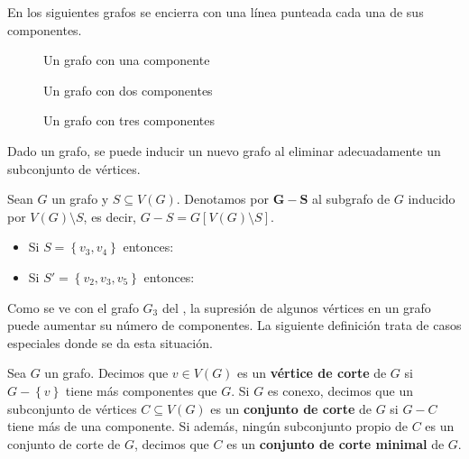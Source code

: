 \begin{Ejm}
   En los siguientes grafos se encierra con una línea punteada cada una de sus componentes.
   \begin{figure}[H]
     \centering
       \resizebox{0.45\textwidth}{!}{}
     \caption{Un grafo con una componente}
   \end{figure}
   \begin{figure}[H]
     \centering
       \resizebox{0.35\textwidth}{!}{}
     \caption{Un grafo con dos componentes}
   \end{figure}
   \begin{figure}[H]
     \centering
       \resizebox{0.55\textwidth}{!}{}
     \caption{Un grafo con tres componentes}
   \end{figure}
\end{Ejm}
Dado un grafo, se puede inducir un nuevo grafo al eliminar adecuadamente un subconjunto de vértices.
\begin{Def}
   Sean $G$ un grafo y $S\subseteq V(G)$. Denotamos por $\bm{G-S}$ al subgrafo de $G$ inducido por $V(G)\setminus S$, es decir, $G-S=G[V(G)\setminus S]$. 
\end{Def}\clearpage
\begin{Ejm}\label{Ejm:Supresion}
   \phantom{0}
   \begin{itemize}
      \item Si $S=\left\lbrace v_3,v_4\right\rbrace$ entonces:  
           
      \item Si $S'=\left\lbrace v_2,v_3,v_5\right\rbrace$ entonces:
         \vspace{1em}
           
   \end{itemize}
\end{Ejm}
Como se ve con el grafo $G_3$ del , la supresión de algunos vértices en un grafo puede aumentar su número de componentes. La siguiente definición trata de casos especiales donde se da esta situación.
\begin{Def}
   Sea $G$ un grafo. Decimos que $v\in V(G)$ es un \textbf{vértice de corte} de $G$ si $G-\left\lbrace v\right\rbrace$ tiene más componentes que $G$. Si $G$ es conexo, decimos que un subconjunto de vértices $C\subseteq V(G)$ es un \textbf{conjunto de corte} de $G$ si $G-C$ tiene más de una componente. Si además, ningún subconjunto propio de $C$ es un conjunto de corte de $G$, decimos que $C$ es un \textbf{conjunto de corte minimal} de $G$.  
\end{Def}
